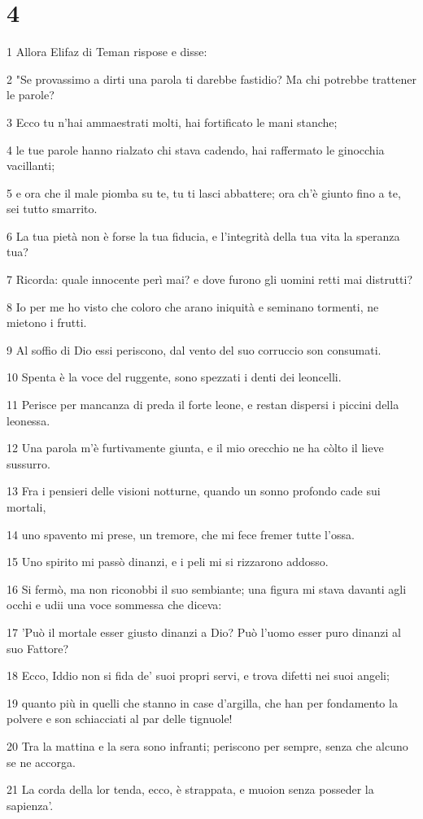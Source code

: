 \chapter{4}

\par 1 Allora Elifaz di Teman rispose e disse:
\par 2 "Se provassimo a dirti una parola ti darebbe fastidio? Ma chi potrebbe trattener le parole?
\par 3 Ecco tu n'hai ammaestrati molti, hai fortificato le mani stanche;
\par 4 le tue parole hanno rialzato chi stava cadendo, hai raffermato le ginocchia vacillanti;
\par 5 e ora che il male piomba su te, tu ti lasci abbattere; ora ch'è giunto fino a te, sei tutto smarrito.
\par 6 La tua pietà non è forse la tua fiducia, e l'integrità della tua vita la speranza tua?
\par 7 Ricorda: quale innocente perì mai? e dove furono gli uomini retti mai distrutti?
\par 8 Io per me ho visto che coloro che arano iniquità e seminano tormenti, ne mietono i frutti.
\par 9 Al soffio di Dio essi periscono, dal vento del suo corruccio son consumati.
\par 10 Spenta è la voce del ruggente, sono spezzati i denti dei leoncelli.
\par 11 Perisce per mancanza di preda il forte leone, e restan dispersi i piccini della leonessa.
\par 12 Una parola m'è furtivamente giunta, e il mio orecchio ne ha còlto il lieve sussurro.
\par 13 Fra i pensieri delle visioni notturne, quando un sonno profondo cade sui mortali,
\par 14 uno spavento mi prese, un tremore, che mi fece fremer tutte l'ossa.
\par 15 Uno spirito mi passò dinanzi, e i peli mi si rizzarono addosso.
\par 16 Si fermò, ma non riconobbi il suo sembiante; una figura mi stava davanti agli occhi e udii una voce sommessa che diceva:
\par 17 'Può il mortale esser giusto dinanzi a Dio? Può l'uomo esser puro dinanzi al suo Fattore?
\par 18 Ecco, Iddio non si fida de' suoi propri servi, e trova difetti nei suoi angeli;
\par 19 quanto più in quelli che stanno in case d'argilla, che han per fondamento la polvere e son schiacciati al par delle tignuole!
\par 20 Tra la mattina e la sera sono infranti; periscono per sempre, senza che alcuno se ne accorga.
\par 21 La corda della lor tenda, ecco, è strappata, e muoion senza posseder la sapienza'.

